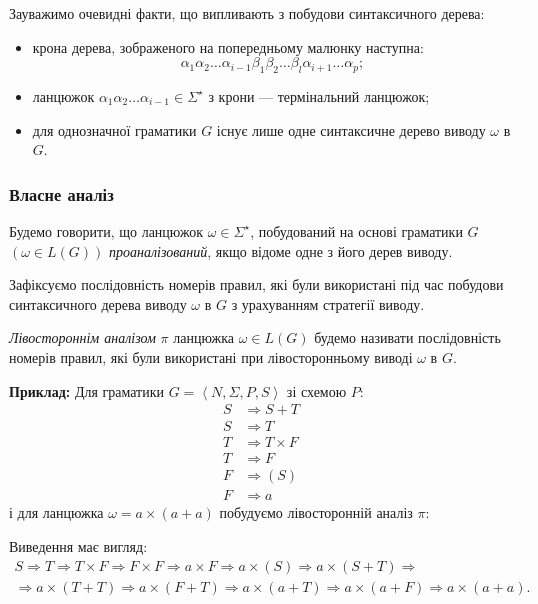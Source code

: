 Зауважимо очевидні факти, що випливають з побудови синтаксичного дерева:
\begin{itemize}
	\item крона дерева, зображеного на попередньому малюнку наступна:
	\begin{equation}
		\alpha_1 \alpha_2 \ldots \alpha_{i - 1} \beta_1 \beta_2 \ldots \beta_l \alpha_{i + 1} \ldots \alpha_p;
	\end{equation}
	\item ланцюжок $\alpha_1 \alpha_2 \ldots \alpha_{i - 1} \in \Sigma^\star$ з крони --- термінальний ланцюжок;
	\item для однозначної граматики $G$ існує лише одне синтаксичне дерево виводу $\omega$ в $G$.
\end{itemize}

\subsubsection{Власне аналіз}

Будемо говорити, що ланцюжок $\omega \in \Sigma^\star$, побудований на основі граматики $G$ $\left(\omega \in L(G)\right)$ \textit{проаналізований}, якщо відоме одне з його дерев виводу. \medskip

Зафіксуємо послідовність номерів правил, які були використані під час побудови синтаксичного дерева виводу $\omega$ в $G$ з урахуванням стратегії виводу. \medskip

\textit{Лівостороннім аналізом} $\pi$ ланцюжка $\omega \in L(G)$ будемо називати послідовність номерів правил, які були використані при лівосторонньому виводі $\omega$ в $G$. \medskip

\textbf{Приклад:} Для граматики $G = \left\langle N, \Sigma, P, S\right\rangle$ зі схемою $P$:
\begin{align}
	S &\Rightarrow S + T \\
	S &\Rightarrow T \\
	T &\Rightarrow T \times F \\
	T &\Rightarrow F \\
	F &\Rightarrow (S) \\
	F &\Rightarrow a
\end{align}
і для ланцюжка $\omega = a \times (a + a)$ побудуємо лівосторонній аналіз $\pi$: \medskip

Виведення має вигляд:
\begin{multline*}
	S \Rightarrow T \Rightarrow T \times F \Rightarrow F \times F \Rightarrow a \times F \Rightarrow a \times (S) \Rightarrow a \times (S + T) \Rightarrow \\
	\Rightarrow a \times (T + T) \Rightarrow a \times (F + T) \Rightarrow a \times (a + T) \Rightarrow a \times (a + F) \Rightarrow a \times (a + a).
\end{multline*}

